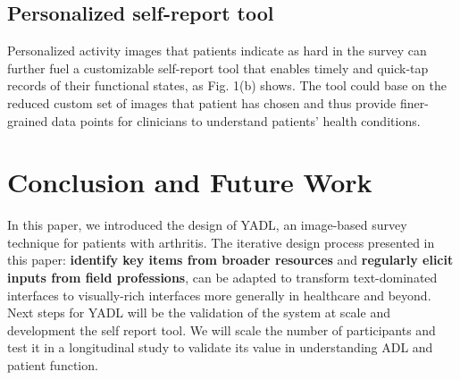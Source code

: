 \documentclass{sig-alternate-05-2015}
\begin{document}
\subsection{Personalized self-report tool}

Personalized activity images that patients indicate as hard in the survey can further fuel a customizable self-report tool that enables timely and quick-tap records of their functional states, as Fig. 1(b) shows. The tool could base on the reduced custom set of images that patient has chosen and thus provide finer-grained data points for clinicians to understand patients’ health conditions.
\vspace{-3mm}
\section{Conclusion and Future Work}

In this paper, we introduced the design of YADL, an image-based survey technique for patients with arthritis. The iterative design process presented in this paper: \textbf{identify key items from broader resources} and \textbf{regularly elicit inputs from field professions}, can be adapted to transform text-dominated interfaces to visually-rich interfaces more generally in healthcare and beyond. Next steps for YADL will be the validation of the system at scale and development the self report tool. We will scale the number of participants and test it in a longitudinal study to validate its value in understanding ADL and patient function.




  
\end{document}
